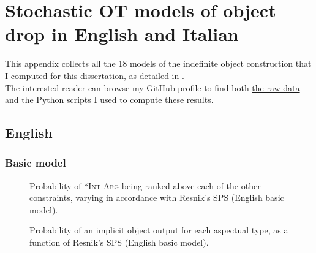 \chapter{Stochastic OT models of object drop in English and Italian}

This appendix collects all the 18 models of the indefinite object construction that I computed for this dissertation, as detailed in .\\
The interested reader can browse my GitHub profile to find both \href{https://github.com/giuliacappelli/dissertationData}{the raw data} and \href{https://github.com/giuliacappelli/MedinaStochasticOptimalityTheory}{the Python scripts} I used to compute these results.

\section{English} 

\subsection{Basic model} 


\begin{figure}[htb]
\caption{Probability of \textsc{*Int Arg} being ranked above each of the other constraints, varying in accordance with Resnik's SPS (English basic model).}
    
\end{figure}

\begin{figure}[htb]
\caption{Probability of an implicit object output for each aspectual type, as a function of Resnik's SPS (English basic model).}
    
\end{figure}


